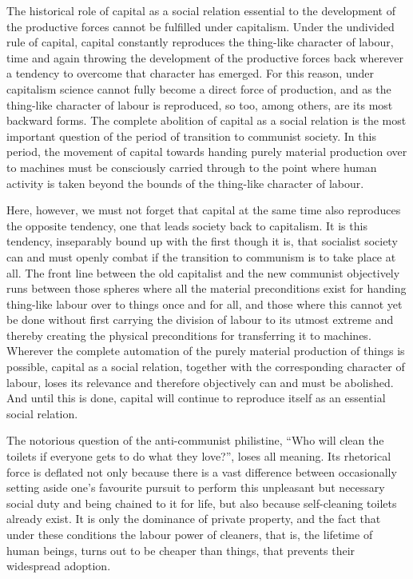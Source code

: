 \documentclass[12pt,a4paper,openany]{book}
\begin{document}
The historical role of capital as a social relation essential to the development of the productive forces cannot be fulfilled under capitalism. Under the undivided rule of capital, capital constantly reproduces the thing-like character of labour, time and again throwing the development of the productive forces back wherever a tendency to overcome that character has emerged. For this reason, under capitalism science cannot fully become a direct force of production, and as the thing-like character of labour is reproduced, so too, among others, are its most backward forms. The complete abolition of capital as a social relation is the most important question of the period of transition to communist society. In this period, the movement of capital towards handing purely material production over to machines must be consciously carried through to the point where human activity is taken beyond the bounds of the thing-like character of labour.

Here, however, we must not forget that capital at the same time also reproduces the opposite tendency, one that leads society back to capitalism. It is this tendency, inseparably bound up with the first though it is, that socialist society can and must openly combat if the transition to communism is to take place at all. The front line between the old capitalist and the new communist objectively runs between those spheres where all the material preconditions exist for handing thing-like labour over to things once and for all, and those where this cannot yet be done without first carrying the division of labour to its utmost extreme and thereby creating the physical preconditions for transferring it to machines. Wherever the complete automation of the purely material production of things is possible, capital as a social relation, together with the corresponding character of labour, loses its relevance and therefore objectively can and must be abolished. And until this is done, capital will continue to reproduce itself as an essential social relation.

The notorious question of the anti-communist philistine, “Who will clean the toilets if everyone gets to do what they love?”, loses all meaning. Its rhetorical force is deflated not only because there is a vast difference between occasionally setting aside one’s favourite pursuit to perform this unpleasant but necessary social duty and being chained to it for life, but also because self-cleaning toilets already exist. It is only the dominance of private property, and the fact that under these conditions the labour power of cleaners, that is, the lifetime of human beings, turns out to be cheaper than things, that prevents their widespread adoption.
\end{document}
